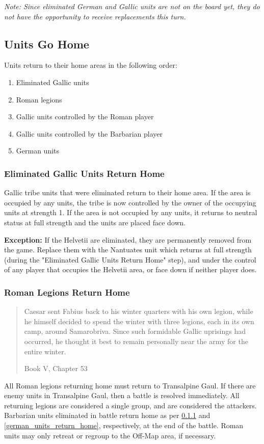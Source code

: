 \textit{Note: Since eliminated German and Gallic units are not on the board yet, they do not have the opportunity to receive replacements this turn.}

\subsection{Units Go Home}

\begin{samepage}
Units return to their home areas in the following order:
\begin{enumerate}
  \setlength\itemsep{0em}
  \item {\small Eliminated Gallic units}
  \item {\small Roman legions}
  \item {\small Gallic units controlled by the Roman player}
  \item {\small Gallic units controlled by the Barbarian player}
  \item {\small German units}
\end{enumerate}
\end{samepage}

\subsubsection{Eliminated Gallic Units Return Home}
\label{eliminated_gallic_units_return_home}
\par
Gallic tribe units that were eliminated return to their home area. If the area is occupied by any units, the tribe is now controlled by the owner of the occupying units at strength 1. If the area is not occupied by any units, it returns to neutral status at full strength and the units are placed face down.

\textbf{Exception:} If the Helvetii are eliminated, they are permanently removed from the game. Replace them with the Nantuates unit which returns at full strength (during the "Eliminated Gallic Units Return Home" step), and under the control of any player that occupies the Helvetii area, or face down if neither player does.

\subsubsection{Roman Legions Return Home}
\blockquote[Book V, Chapter 53]{Caesar sent Fabius back to his winter quarters with his own legion, while he himself decided to spend the winter with three legions, each in its own camp, around Samarobriva. Since such formidable Gallic uprisings had occurred, he thought it best to remain personally near the army for the entire winter.}
\par
All Roman legions returning home must return to Transalpine Gaul. If there are enemy units in Transalpine Gaul, then a battle is resolved immediately. All returning legions are considered a single group, and are considered the attackers. Barbarian units eliminated in battle return home as per \ref{eliminated_gallic_units_return_home} and \ref{german_units_return_home}, respectively, at the end of the battle. Roman units may only retreat or regroup to the Off-Map area, if necessary.


